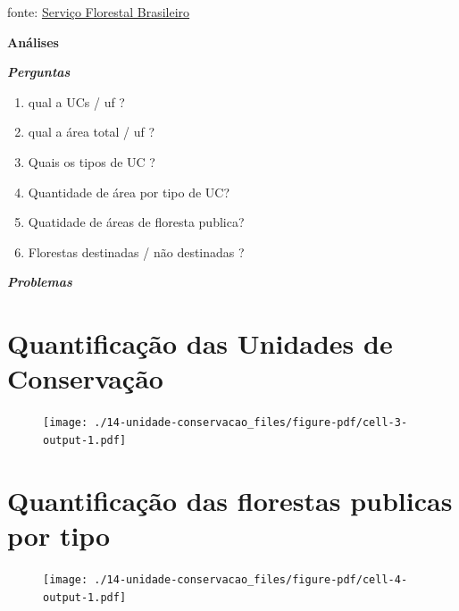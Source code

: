 \documentclass[
  letterpaper,
]{report}
\providecommand{\tightlist}{%
  \setlength{\itemsep}{0pt}\setlength{\parskip}{0pt}}\usepackage{longtable,booktabs,array}
\begin{document}
fonte:
\href{https://www.gov.br/agricultura/pt-br/assuntos/servico-florestal-brasileiro/cadastro-nacional-de-florestas-publicas}{Serviço
Florestal Brasileiro}

\textbf{Análises}

\textbf{\emph{Perguntas}}

\begin{enumerate}
\def\labelenumi{\arabic{enumi}.}
\tightlist
\item
  qual a UCs / uf ?
\item
  qual a área total / uf ?
\item
  Quais os tipos de UC ?
\item
  Quantidade de área por tipo de UC?
\item
  Quatidade de áreas de floresta publica?
\item
  Florestas destinadas / não destinadas ?
\end{enumerate}

\textbf{\emph{Problemas}}

\hypertarget{quantificauxe7uxe3o-das-unidades-de-conservauxe7uxe3o}{%
\section{Quantificação das Unidades de
Conservação}\label{quantificauxe7uxe3o-das-unidades-de-conservauxe7uxe3o}}

\begin{figure}

\texttt{[image: ./14-unidade-conservacao\_files/figure-pdf/cell-3-output-1.pdf]}

\end{figure}

\hypertarget{quantificauxe7uxe3o-das-florestas-publicas-por-tipo}{%
\section{Quantificação das florestas publicas por
tipo}\label{quantificauxe7uxe3o-das-florestas-publicas-por-tipo}}

\begin{figure}

\texttt{[image: ./14-unidade-conservacao\_files/figure-pdf/cell-4-output-1.pdf]}

\end{figure}

\n  

\n    

\n      
\end{document}
